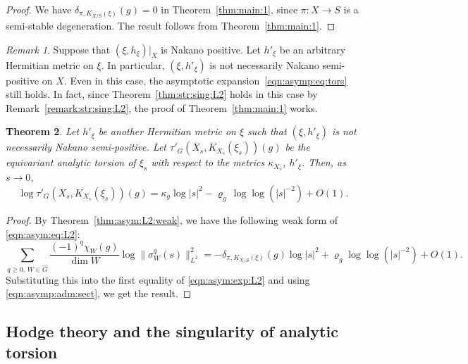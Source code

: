 \documentclass[amscd, leqno]{amsart}
\theoremstyle{plain}
\newtheorem{theorem}{Theorem}[section]
\theoremstyle{definition}
\theoremstyle{remark}
\newtheorem{remark}[theorem]{Remark}
\newenvironment{pf}{\begin{proof}}{\end{proof}}
\begin{document}
\begin{pf}
We have $\delta_{\pi, K_{X/S}(\xi)}(g) = 0$ in Theorem~\ref{thm:main:1}, since $\pi\colon X\to S$ is a semi-stable degeneration. 
The result follows from Theorem~\ref{thm:main:1}.
\end{pf}


\begin{remark}
Suppose that $(\xi, h_{\xi})|_{X}$ is Nakano positive. Let $h'_{\xi}$ be an arbitrary Hermitian metric on $\xi$. 
In particular, $(\xi, h'_{\xi})$ is not necessarily Nakano semi-positive on $X$. 
Even in this case, the asymptotic expansion~\eqref{eqn:asymp:eq:tors} still holds. In fact, since Theorem~\ref{thm:str:sing:L2} holds 
in this case by Remark~\ref{remark:str:sing:L2}, the proof of Theorem~\ref{thm:main:1} works.
\end{remark}


\begin{theorem}
\label{thm:asym:tors:weak}
Let $h'_{\xi}$ be another Hermitian metric on $\xi$ such that $(\xi, h'_{\xi})$ is not necessarily Nakano semi-positive. 
Let $\tau'_{G}(X_{s},K_{X_{s}}(\xi_{s}))(g)$ be the equivariant analytic torsion of $\xi_{s}$ with respect to the metrics 
$\kappa_{X_{s}}$, $h'_{\xi}$. Then, as $s \to 0$,
$$
\log \tau'_{G}(X_{s},K_{X_{s}}(\xi_{s}))(g) = \kappa_{g} \log |s|^{2} - \varrho_{g}\,\log\log( |s|^{-2}) + O\left( 1 \right).
$$
\end{theorem}

\begin{pf}
By Theorem~\ref{thm:asym:L2:weak}, we have the following weak form of \eqref{eqn:asym:eq:L2}:
$$
\sum_{q\geq0,\,W\in\widehat{G}} \frac{(-1)^{q}\chi_{W}(g)}{\dim W} \log \|\sigma^{q}_{W}(s)\|_{L^{2}}^{2}
=
-\delta_{\pi, K_{X/S}(\xi)}(g) \log |s|^{2} + \varrho_{g} \log\log (|s|^{-2}) + O\left( 1 \right).
$$
Substituting this into the first equality of \eqref{eqn:asym:exp:L2} and using \eqref{eqn:asymp:adm:sect}, we get the result.
\end{pf}




\subsection
{Hodge theory and the singularity of analytic torsion}
\label{sect:5.2}
\end{document}
